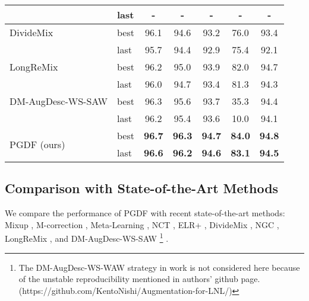 \documentclass[letterpaper]{article} \usepackage{aaai22}  \usepackage{times}  \usepackage{helvet}  \usepackage{courier}  \usepackage[hyphens]{url}  \usepackage{graphicx} \urlstyle{rm} \def\UrlFont{\rm}  \usepackage{natbib}  \usepackage{caption} \DeclareCaptionStyle{ruled}{labelfont=normalfont,labelsep=colon,strut=off} \frenchspacing  \setlength{\pdfpagewidth}{8.5in}  \setlength{\pdfpageheight}{11in}  \usepackage{algorithm}
\begin{document}
\begin{table}[]
\begin{tabular}{@{}llccccc@{}}
\multirow{1}{*}{\cite{2020Early}}                                         & \multicolumn{1}{l|}{last} & -             & -             & -             & \multicolumn{1}{c|}{-}             & -                         \\ \midrule
\multirow{1}{*}{DivideMix}         & \multicolumn{1}{l|}{best} & 96.1          & 94.6          & 93.2          & \multicolumn{1}{c|}{76.0}          & 93.4                      \\
\multirow{1}{*}{\cite{2020DivideMix}}                                         & \multicolumn{1}{l|}{last} & 95.7          & 94.4          & 92.9          & \multicolumn{1}{c|}{75.4}          & 92.1                      \\ \midrule
\multirow{1}{*}{LongReMix}         & \multicolumn{1}{l|}{best} & 96.2          & 95.0          & 93.9          & \multicolumn{1}{c|}{82.0}          & 94.7                      \\
\multirow{1}{*}{\cite{2021LongReMix}}                                         & \multicolumn{1}{l|}{last} & 96.0          & 94.7          & 93.4          & \multicolumn{1}{c|}{81.3}          & 94.3                      \\ \midrule
\multirow{1}{*}{DM-AugDesc-WS-SAW} & \multicolumn{1}{l|}{best} & 96.3          & 95.6          & 93.7          & \multicolumn{1}{c|}{35.3}          & 94.4                      \\
\multirow{1}{*}{\cite{2021Augmentation}}                                         & \multicolumn{1}{l|}{last} & 96.2          & 95.4          & 93.6          & \multicolumn{1}{c|}{10.0}          & 94.1                      \\ \midrule
\multirow{2}{*}{PGDF (ours)}              & \multicolumn{1}{l|}{best} & \textbf{96.7} & \textbf{96.3} & \textbf{94.7} & \multicolumn{1}{c|}{\textbf{84.0}} & \textbf{94.8}             \\
                                         & \multicolumn{1}{l|}{last}                      & \textbf{96.6} & \textbf{96.2} & \textbf{94.6} & \multicolumn{1}{c|}{\textbf{83.1}}                      & \textbf{94.5}             \\ \bottomrule
\end{tabular}
\label{exp:cifar_10}
\vskip -0.1in
\end{table}

\subsection{Comparison with State-of-the-Art Methods}
We compare the performance of PGDF with recent state-of-the-art methods: Mixup \cite{2018mixup}, M-correction \cite{2019Unsupervised}, Meta-Learning \cite{2019Learning}, {NCT} \cite{2020Noisy}, ELR+ \cite{2020Early}, DivideMix \cite{2020DivideMix}, {NGC} \cite{wu2021ngc}, LongReMix \cite{2021LongReMix}, and DM-AugDesc-WS-SAW \footnote{The DM-AugDesc-WS-WAW strategy in work \cite{2021Augmentation} is not considered here because of the unstable reproducibility mentioned in authors' github page. ({https://github.com/KentoNishi/Augmentation-for-LNL/})} \cite{2021Augmentation}.
\end{document}
